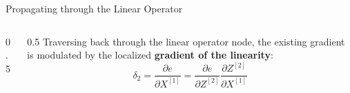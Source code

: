 \begin{frame}{Propagating through the Linear Operator}
\begin{columns}
\begin{column}{0.5\textwidth}
\begin{center}
{\begin{tikzpicture}
					\end{tikzpicture}
				}
			\end{center}
		\end{column}
		\begin{column}{0.5\textwidth}
			Traversing back through the linear operator node, the existing gradient is modulated by the localized \textbf{\textcolor{lime!80!black}{gradient of the linearity}}:
			\begin{equation*}
				\delta_2 = \frac{\partial{e}}{\partial{X^{[1]}}} = \frac{\partial{e}}{\partial{Z^{[2]}}} \frac{\partial{Z^{[2]}}}{\partial{X^{[1]}}}
			\end{equation*}
		\end{column}
	\end{columns}
\end{frame}


